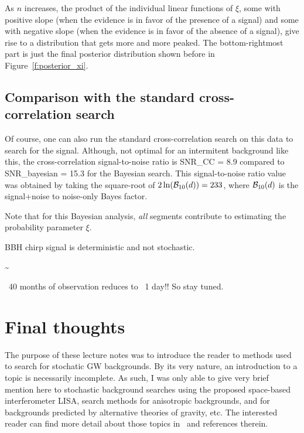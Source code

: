 %
As $n$ increases, the product of the individual linear functions 
of $\xi$,
some with positive slope (when the evidence is in favor of the 
presence of a signal) and some with negative slope (when the 
evidence is in favor of the absence of a signal), give rise to 
a distribution that gets more and more peaked.
The bottom-rightmost part is just the final posterior distribution
shown before in Figure~\ref{f:posterior_xi}.
%

\subsection{Comparison with the standard cross-correlation search}

Of course, one can also run the standard cross-correlation search
on this data to search for the signal.
Although, not optimal for an intermitent background like this,
the cross-correlation signal-to-noise ratio is 
%
\be
{\rm SNR}_{\rm CC} = 8.9
\ee
%
compared to
%
\be
{\rm SNR}_{\rm bayesian} = 15.3
\ee
%
for the Bayesian search.
This signal-to-noise ratio value was obtained by taking the square-root
of $2\ln({\cal B}_{10}(d)) = 233$, where ${\cal B}_{10}(d)$ is the 
signal+noise to noise-only Bayes factor.

Note that for this Bayesian analysis, {\em all} segments contribute
to estimating the probability parameter $\xi$.

BBH chirp signal is deterministic and not stochastic.

\be
{}\sim {}
\ee

~40 months of observation reduces to ~1 day!!
So stay tuned.

\section{Final thoughts}

The purpose of these lecture notes was to introduce the reader to
methods used to search for stochatic GW backgrounds.
By its very nature, an introduction to a topic is necessarily
incomplete.
As such, I was only able to give very brief mention here
to stochastic background searches using the proposed space-based
interferometer LISA, search methods for anisotropic backgrounds, 
and for backgrounds predicted by alternative theories of gravity, etc.
The interested reader can find more detail about those topics
in~\cite{Romano-Cornish:2017} and references therein.

